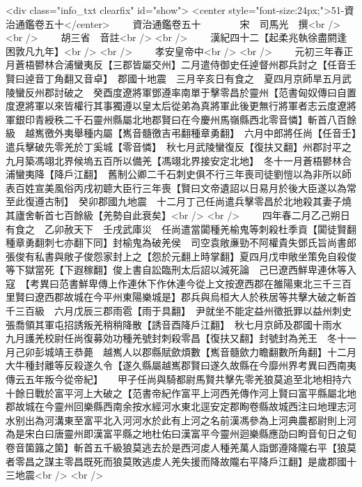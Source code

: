<div class="info_txt clearfix" id="show">
<center style="font-size:24px;">51-資治通鑑卷五十</center>
  　　資治通鑑卷五十　　　　宋　司馬光　撰<br />
<br />
　　胡三省　音註<br />
<br />
　　漢紀四十二【起柔兆執徐盡閼逢困敦凡九年】<br />
<br />
　　孝安皇帝中<br />
<br />
　　元初三年春正月蒼梧鬰林合浦蠻夷反【三郡皆屬交州】二月遣侍御史任逴督州郡兵討之【任音壬賢曰逴音丁角翻又音卓】　郡國十地震　三月辛亥日有食之　夏四月京師旱五月武陵蠻反州郡討破之　癸酉度遼將軍鄧遵率南單于擊零昌於靈州【范書匈奴傳曰自置度遼將軍以來皆權行其事獨遵以皇太后從弟為真將軍此後更無行將軍者志云度遼將軍銀印青綬秩二千石靈州縣屬北地郡賢曰在今慶州馬嶺縣西北零音憐】斬首八百餘級　越嶲徼外夷舉種内屬【嶲音髓徼吉弔翻種章勇翻】　六月中郎將任尚【任音壬】遣兵擊破先零羌於丁奚城【零音憐】　秋七月武陵蠻復反【復扶又翻】州郡討平之　九月築馮翊北界候塢五百所以備羌【馮翊北界接安定北地】　冬十一月蒼梧鬰林合浦蠻夷降【降戶江翻】　舊制公卿二千石刺史俱不行三年喪司徒劉愷以為非所以師表百姓宣美風俗丙戌初聼大臣行三年喪【賢曰文帝遺詔以日易月於後大臣遂以為常至此復遵古制】　癸卯郡國九地震　十二月丁己任尚遣兵擊零昌於北地殺其妻子燒其廬舍斬首七百餘級【羌勢自此衰矣】<br />
<br />
　　四年春二月乙己朔日有食之　乙卯赦天下　壬戌武庫災　任尚遣當闐種羌榆鬼等刺殺杜季貢【闐徒賢翻種章勇翻刺七亦翻下同】封榆鬼為破羌侯　司空袁敞亷勁不阿權貴失鄧氏旨尚書郎張俊有私書與敞子俊怨家封上之【怨於元翻上時掌翻】夏四月戊申敞坐策免自殺俊等下獄當死【下遐稼翻】俊上書自訟臨刑太后詔以減死論　己巳遼西鮮卑連休等入寇　【考異曰范書鮮卑傳上作連休下作休連今從上文按遼西郡在雒陽東北三千三百里賢曰遼西郡故城在今平州東陽樂城是】郡兵與烏桓大人於秩居等共擊大破之斬首千三百級　六月戊辰三郡雨雹【雨于具翻】　尹就坐不能定益州徵扺罪以益州刺史張喬領其軍屯招誘叛羌稍稍降散【誘音酉降戶江翻】　秋七月京師及郡國十雨水　九月護羌校尉任尚復募効功種羌號封刺殺零昌【復扶又翻】封號封為羌王　冬十一月己卯彭城靖王恭薨　越嶲人以郡縣賦歛煩數【嶲音髓歛力瞻翻數所角翻】十二月大牛種封離等反殺遂久令【遂久縣屬越嶲郡賢曰遂久故縣在今靡州界考異曰西南夷傳云五年叛今從帝紀】　　甲子任尚與騎都尉馬賢共擊先零羌狼莫追至北地相持六十餘日戰於富平河上大破之【范書帝紀作富平上河西羌傳作河上賢曰富平縣屬北地郡故城在今靈州回樂縣西南余按水經河水東北逕安定郡眴卷縣故城西注曰地理志河水别出為河溝東至富平北入河河水於此有上河之名前漢馮參為上河典農都尉則上河為是宋白曰唐靈州即漢富平縣之地杜佑曰漢富平今靈州迴樂縣應劭曰眗音旬日之旬卷音箘簬之箘】斬首五千級狼莫逃去於是西河䖍人種羌萬人詣鄧遵降隴右平【狼莫者零昌之謀主零昌既死而狼莫敗逃䖍人羌失援而降故隴右平降戶江翻】是歲郡國十三地震<br />
<br />
